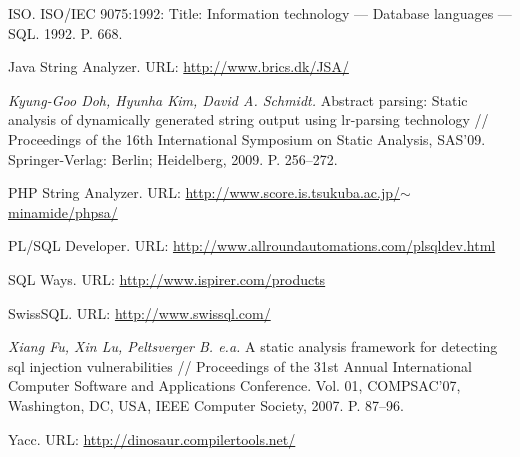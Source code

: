 \documentclass[a5paper]{article}
\begin{document}
\begin{thebibliography}{99}
ISO. ISO/IEC 9075:1992: Title: Information technology — Database languages — SQL. 1992. P. 668.

Java String Analyzer. URL: \href{http://www.brics.dk/JSA/}{http://www.brics.dk/JSA/}

\emph{Kyung-Goo Doh, Hyunha Kim, David A. Schmidt.} Abstract parsing: Static analysis of dynamically generated string output using lr-parsing technology // Proceedings of the 16th International Symposium on Static Analysis, SAS’09. Springer-Verlag: Berlin; Heidelberg, 2009. P. 256–272.

PHP String Analyzer. URL: \href{http://www.score.is.tsukuba.ac.jp/~minamide/phpsa/}{http://www.score.is.tsukuba.ac.jp/$\sim$minamide/phpsa/}

PL/SQL Developer. URL: \href{http://www.allroundautomations.com/plsqldev.html}{http://www.allroundautomations.com/plsqldev.html}

SQL Ways. URL: \href{http://www.ispirer.com/products}{http://www.ispirer.com/products}

SwissSQL. URL: \href{http://www.swissql.com/}{http://www.swissql.com/}

\emph{Xiang Fu, Xin Lu, Peltsverger B. e.a.} A static analysis framework for detecting sql injection vulnerabilities // Proceedings of the 31st Annual International Computer Software and Applications Conference. Vol. 01, COMPSAC’07, Washington, DC, USA, IEEE Computer Society, 2007. P. 87–96.

Yacc. URL: \href{http://dinosaur.compilertools.net/}{http://dinosaur.compilertools.net/}

\end{thebibliography}
\end{document}
